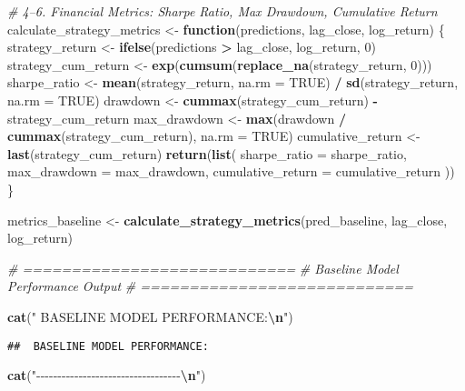 \documentclass[
]{article}
\newenvironment{Shaded}{\begin{snugshade}}{\end{snugshade}}
\newcommand{\AttributeTok}[1]{\textcolor[rgb]{0.13,0.29,0.53}{#1}}
\newcommand{\CommentTok}[1]{\textcolor[rgb]{0.56,0.35,0.01}{\textit{#1}}}
\newcommand{\ConstantTok}[1]{\textcolor[rgb]{0.56,0.35,0.01}{#1}}
\newcommand{\ControlFlowTok}[1]{\textcolor[rgb]{0.13,0.29,0.53}{\textbf{#1}}}
\newcommand{\DecValTok}[1]{\textcolor[rgb]{0.00,0.00,0.81}{#1}}
\newcommand{\FunctionTok}[1]{\textcolor[rgb]{0.13,0.29,0.53}{\textbf{#1}}}
\newcommand{\NormalTok}[1]{#1}
\newcommand{\OtherTok}[1]{\textcolor[rgb]{0.56,0.35,0.01}{#1}}
\newcommand{\SpecialCharTok}[1]{\textcolor[rgb]{0.81,0.36,0.00}{\textbf{#1}}}
\newcommand{\StringTok}[1]{\textcolor[rgb]{0.31,0.60,0.02}{#1}}
\begin{document}
\begin{Shaded}
\begin{Highlighting}[]
\CommentTok{\# 4–6. Financial Metrics: Sharpe Ratio, Max Drawdown, Cumulative Return}
\NormalTok{calculate\_strategy\_metrics }\OtherTok{\textless{}{-}} \ControlFlowTok{function}\NormalTok{(predictions, lag\_close, log\_return) \{}
\NormalTok{  strategy\_return }\OtherTok{\textless{}{-}} \FunctionTok{ifelse}\NormalTok{(predictions }\SpecialCharTok{\textgreater{}}\NormalTok{ lag\_close, log\_return, }\DecValTok{0}\NormalTok{)}
\NormalTok{  strategy\_cum\_return }\OtherTok{\textless{}{-}} \FunctionTok{exp}\NormalTok{(}\FunctionTok{cumsum}\NormalTok{(}\FunctionTok{replace\_na}\NormalTok{(strategy\_return, }\DecValTok{0}\NormalTok{)))}
\NormalTok{  sharpe\_ratio }\OtherTok{\textless{}{-}} \FunctionTok{mean}\NormalTok{(strategy\_return, }\AttributeTok{na.rm =} \ConstantTok{TRUE}\NormalTok{) }\SpecialCharTok{/} \FunctionTok{sd}\NormalTok{(strategy\_return, }\AttributeTok{na.rm =} \ConstantTok{TRUE}\NormalTok{)}
\NormalTok{  drawdown }\OtherTok{\textless{}{-}} \FunctionTok{cummax}\NormalTok{(strategy\_cum\_return) }\SpecialCharTok{{-}}\NormalTok{ strategy\_cum\_return}
\NormalTok{  max\_drawdown }\OtherTok{\textless{}{-}} \FunctionTok{max}\NormalTok{(drawdown }\SpecialCharTok{/} \FunctionTok{cummax}\NormalTok{(strategy\_cum\_return), }\AttributeTok{na.rm =} \ConstantTok{TRUE}\NormalTok{)}
\NormalTok{  cumulative\_return }\OtherTok{\textless{}{-}} \FunctionTok{last}\NormalTok{(strategy\_cum\_return)}
  \FunctionTok{return}\NormalTok{(}\FunctionTok{list}\NormalTok{(}
    \AttributeTok{sharpe\_ratio =}\NormalTok{ sharpe\_ratio,}
    \AttributeTok{max\_drawdown =}\NormalTok{ max\_drawdown,}
    \AttributeTok{cumulative\_return =}\NormalTok{ cumulative\_return}
\NormalTok{  ))}
\NormalTok{\}}

\NormalTok{metrics\_baseline }\OtherTok{\textless{}{-}} \FunctionTok{calculate\_strategy\_metrics}\NormalTok{(pred\_baseline, lag\_close, log\_return)}

\CommentTok{\# ============================}
\CommentTok{\#  Baseline Model Performance Output}
\CommentTok{\# ============================}

\FunctionTok{cat}\NormalTok{(}\StringTok{" BASELINE MODEL PERFORMANCE:}\SpecialCharTok{\textbackslash{}n}\StringTok{"}\NormalTok{)}
\end{Highlighting}
\end{Shaded}

\begin{verbatim}
##  BASELINE MODEL PERFORMANCE:
\end{verbatim}

\begin{Shaded}
\begin{Highlighting}[]
\FunctionTok{cat}\NormalTok{(}\StringTok{"{-}{-}{-}{-}{-}{-}{-}{-}{-}{-}{-}{-}{-}{-}{-}{-}{-}{-}{-}{-}{-}{-}{-}{-}{-}{-}{-}{-}{-}{-}{-}{-}{-}{-}}\SpecialCharTok{\textbackslash{}n}\StringTok{"}\NormalTok{)}
\end{Highlighting}
\end{Shaded}
\end{document}
